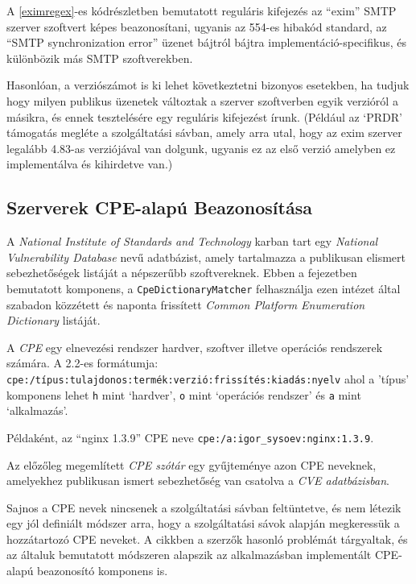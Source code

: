 \documentclass[a4paper,12pt]{article}
\begin{document}
	A \ref{eximregex}-es kódrészletben bemutatott reguláris kifejezés az ``exim'' SMTP szerver szoftvert képes beazonosítani, ugyanis az 554-es hibakód standard, az ``SMTP synchronization error'' üzenet bájtról bájtra implementáció-specifikus, és különbözik más SMTP szoftverekben.
	
	Hasonlóan, a verziószámot is ki lehet következtetni bizonyos esetekben, ha tudjuk hogy milyen publikus üzenetek változtak a szerver szoftverben egyik verzióról a másikra, és ennek tesztelésére egy reguláris kifejezést írunk. (Például az `PRDR' támogatás megléte a szolgáltatási sávban, amely arra utal, hogy az exim szerver legalább 4.83-as verziójával van dolgunk, ugyanis ez az első verzió amelyben ez implementálva és kihirdetve van.)

\subsection{Szerverek CPE-alapú Beazonosítása} \label{ssec:matchcpe}

	A \textit{National Institute of Standards and Technology} karban tart egy \textit{National Vulnerability Database} nevű adatbázist, amely tartalmazza a publikusan elismert sebezhetőségek listáját a népszerűbb szoftvereknek. Ebben a fejezetben bemutatott komponens, a \texttt{CpeDictionaryMatcher} felhasználja ezen intézet által szabadon közzétett és naponta frissített \textit{Common Platform Enumeration Dictionary} listáját.
	
	A \textit{CPE} egy elnevezési rendszer hardver, szoftver illetve operációs rendszerek számára\cite{cpe22}. A 2.2-es formátumja: \texttt{cpe:/típus:tulajdonos:termék:verzió:frissítés:kiadás:nyelv} ahol a 'típus' komponens lehet \texttt{h} mint `hardver', \texttt{o} mint `operációs rendszer' és \texttt{a} mint `alkalmazás'.
	
	Példaként, az ``nginx 1.3.9'' CPE neve \texttt{cpe:/a:igor_sysoev:nginx:1.3.9}.
	
	Az előzőleg megemlített \textit{CPE szótár} egy gyűjteménye azon CPE neveknek, amelyekhez publikusan ismert sebezhetőség van csatolva a \textit{CVE adatbázisban}.
	
	Sajnos a CPE nevek nincsenek a szolgáltatási sávban feltüntetve, és nem létezik egy jól definiált módszer arra, hogy a szolgáltatási sávok alapján megkeressük a hozzátartozó CPE neveket. A \cite{shovat15} cikkben a szerzők hasonló problémát tárgyaltak, és az általuk bemutatott módszeren alapszik az alkalmazásban implementált CPE-alapú beazonosító komponens is.
	
\end{document}
